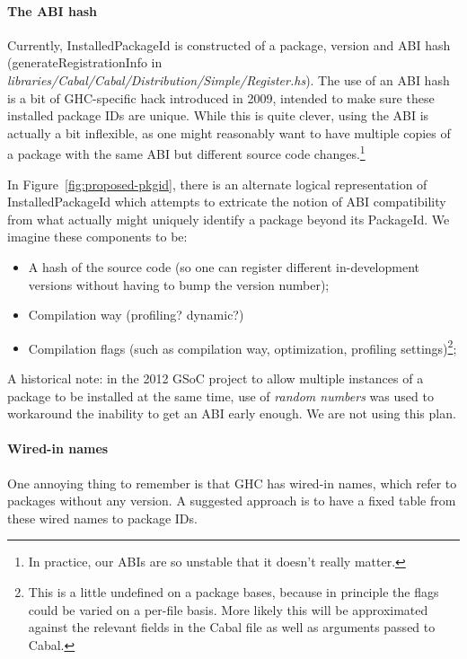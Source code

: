 \documentclass{article}
\newcommand{\ghcfile}[1]{\textsl{#1}}
\begin{document}
\paragraph{The ABI hash} Currently, InstalledPackageId
is constructed of a package, version and ABI hash
(generateRegistrationInfo in
\ghcfile{libraries/Cabal/Cabal/Distribution/Simple/Register.hs}).  The
use of an ABI hash is a bit of GHC-specific hack introduced in 2009,
intended to make sure these installed package IDs are unique.  While
this is quite clever, using the ABI is actually a bit inflexible, as one
might reasonably want to have multiple copies of a package with the same
ABI but different source code changes.\footnote{In practice, our ABIs
are so unstable that it doesn't really matter.}

In Figure~\ref{fig:proposed-pkgid}, there is an alternate logical
representation of InstalledPackageId which attempts to extricate the
notion of ABI compatibility from what actually might uniquely identify a
package beyond its PackageId.  We imagine these components to be:

\begin{itemize}
    \item A hash of the source code (so one can register different
        in-development versions without having to bump the version
        number);
    \item Compilation way (profiling? dynamic?)
    \item Compilation flags (such as compilation way, optimization,
        profiling settings)\footnote{This is a little undefined on a package bases, because in principle the flags could be varied on a per-file basis. More likely this will be approximated against the relevant fields in the Cabal file as well as arguments passed to Cabal.};
\end{itemize}

A historical note: in the 2012 GSoC project to allow multiple instances
of a package to be installed at the same time, use of \emph{random
numbers} was used to workaround the inability to get an ABI early
enough.  We are not using this plan.

\paragraph{Wired-in names} One annoying thing to remember is that GHC
has wired-in names, which refer to packages without any version.  A
suggested approach is to have a fixed table from these wired names to
package IDs.
\end{document}
